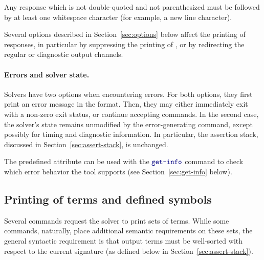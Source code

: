 Any response which is not double-quoted and not parenthesized must be followed 
by at least one whitespace character (for example, a new line character).

Several options described in Section~\ref{sec:options} below affect the printing 
of responses, in particular by suppressing the printing of , 
or by redirecting the regular or diagnostic output channels.

\paragraph{Errors and solver state.} 
Solvers have two options when encountering errors.  
For both options, they first print an error message 
in the  format.  
Then, they may either immediately exit with a non-zero exit status, 
or continue accepting commands.  
In the second case, 
the solver's state remains unmodified by the error-generating command, 
except possibly for timing and diagnostic information.  
In particular, the assertion stack, discussed in Section~\ref{sec:assert-stack}, 
is unchanged.

The predefined  attribute can be used 
with the $\ter{get-info}$ command to check which error behavior 
the tool supports (see Section~\ref{sec:get-info} below).

\subsection{Printing of terms and defined symbols} 
Several commands request the solver to print sets of terms.  
While some commands, naturally, place additional semantic requirements on these sets, 
the general syntactic requirement is that output terms must be well-sorted 
with respect to the current signature (as defined below in Section~\ref{sec:assert-stack}).
%

